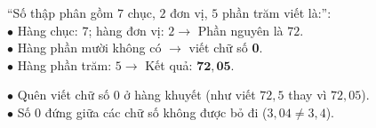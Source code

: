 \documentclass[14pt,a4paper,oneside]{extbook}
\begin{document}
\noindent
\begin{minipage}[t]{0.54\textwidth}
  \begin{tcolorbox}[
    enhanced,
    title={\footnotesize\bfseries\color{white}\faBolt\ Dạng toán viết số thập phân theo cấu tạo},
    colback=green!3!white,
    colframe=green!60!black,
    arc=2.5mm, boxrule=0.8pt, top=1.8mm, bottom=1.8mm, left=2.2mm, right=2.2mm
  ]
    \footnotesize
    ``Số thập phân gồm $7$ chục, $2$ đơn vị, $5$ phần trăm viết là:'':\\
    $\bullet$ Hàng chục: $7$; hàng đơn vị: $2 \rightarrow$ Phần nguyên là $72$.\\
    $\bullet$ Hàng phần mười không có $\rightarrow$ viết chữ số \textbf{0}.\\
    $\bullet$ Hàng phần trăm: $5 \rightarrow$ Kết quả: $\mathbf{72,05}$.
  \end{tcolorbox}
\end{minipage}%
\hfill
\begin{minipage}[t]{0.44\textwidth}
  \begin{tcolorbox}[
    enhanced,
    title={\footnotesize\bfseries\color{white}\faExclamationTriangle\ Mẹo tránh bẫy trắc nghiệm},
    colback=red!2!white,
    colframe=red!70!black,
    arc=2.5mm, boxrule=0.8pt, top=1.8mm, bottom=1.8mm, left=2.2mm, right=2.2mm
  ]
    \footnotesize
    $\bullet$ Quên viết chữ số $0$ ở hàng khuyết (như viết $72,5$ thay vì $72,05$).\\
    $\bullet$ Số $0$ đứng giữa các chữ số không được bỏ đi ($3,04 \neq 3,4$).
  \end{tcolorbox}
\end{minipage}
\end{document}
